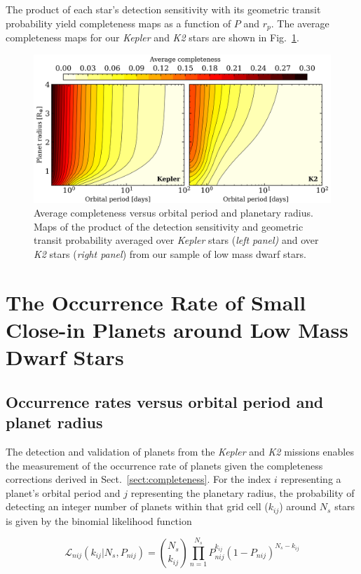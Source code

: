 \documentclass[twocolumn]{emulateapj}
\newcommand{\kepler}[1]{\emph{Kepler}#1}
\newcommand{\ktwo}[1]{\emph{K2}#1}
\begin{document}
The product of each star's detection sensitivity with its geometric transit probability yield completeness
maps as a function of $P$ and $r_p$. The average completeness maps for our \kepler{} and \ktwo{} stars are
shown in Fig.~\ref{fig:compmap}.

\begin{figure}
  \centering
  \includegraphics[width=0.98\hsize]{figures/compmap.png}
  \caption{Average completeness versus orbital period and planetary radius.
    Maps of the product of the detection sensitivity and geometric transit probability averaged over \kepler{} stars
    (\emph{left panel)} and over \ktwo{} stars (\emph{right panel}) from our sample of low mass dwarf stars.} 
  \label{fig:compmap}
\end{figure}


\section{The Occurrence Rate of Small Close-in Planets around Low Mass Dwarf Stars} \label{sect:occurrence}
\subsection{Occurrence rates versus orbital period and planet radius} \label{sect:fmap}
The detection and validation of planets from the \kepler{} and \ktwo{} missions enables the measurement of the
occurrence rate of planets given the completeness corrections derived in Sect.~\ref{sect:completeness}.
For the index $i$ representing a planet's orbital period and $j$ representing the planetary
radius, the probability of detecting an integer number of planets within that grid cell ($k_{ij}$) around
$N_s$ stars is given by the binomial likelihood function

\begin{equation}
  \mathcal{L}_{nij}(k_{ij}|N_s,P_{nij}) = \binom{N_s}{k_{ij}} \prod_{n=1}^{N_s} P_{nij}^{k_{ij}} (1-P_{nij})^{N_s-k_{ij}}
  \label{eq:lnL}
\end{equation}
\end{document}
